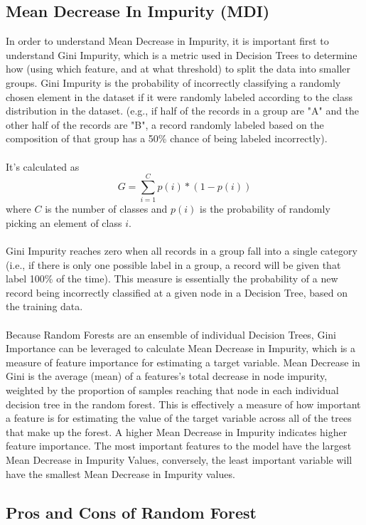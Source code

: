 \documentclass[12pt]{article}
\begin{document}
\subsection{Mean Decrease In Impurity (MDI)}

In order to understand Mean Decrease in Impurity, it is important first to understand Gini Impurity, which is a metric used in Decision Trees to determine how (using which feature, and at what threshold) to split the data into smaller groups.  
Gini Impurity is the probability of incorrectly classifying a randomly chosen element in the dataset if it were randomly labeled according to the class distribution in the dataset. (e.g., if half of the records in a group are "A" and the other half of the records are "B", a record randomly labeled based on the composition of that group has a 50\% chance of being labeled incorrectly).
\\\\
It’s calculated as
$$G = \sum_{i=1}^{C} p(i) * (1-p(i))$$
where $C$ is the number of classes and $p(i)$ is the probability of randomly picking an element of class $i$.
\\\\
Gini Impurity reaches zero when all records in a group fall into a single category (i.e., if there is only one possible label in a group, a record will be given that label 100\% of the time). This measure is essentially the probability of a new record being incorrectly classified at a given node in a Decision Tree, based on the training data. \\\\
Because Random Forests are an ensemble of individual Decision Trees, Gini Importance can be leveraged to calculate Mean Decrease in Impurity, which is a measure of feature importance for estimating a target variable. Mean Decrease in Gini is the average (mean) of a features’s total decrease in node impurity, weighted by the proportion of samples reaching that node in each individual decision tree in the random forest. This is effectively a measure of how important a feature is for estimating the value of the target variable across all of the trees that make up the forest. A higher Mean Decrease in Impurity indicates higher feature importance. The most important features to the model have the largest Mean Decrease in Impurity Values, conversely, the least important variable will have the smallest Mean Decrease in Impurity values. 

\subsection{Pros and Cons of Random Forest}
\end{document}
